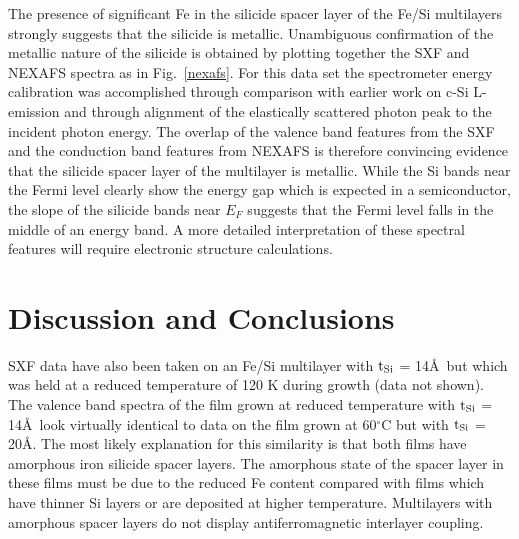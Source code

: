 The presence of significant Fe in the silicide spacer layer of the
Fe/Si multilayers strongly suggests that the silicide is metallic.
Unambiguous confirmation of the metallic nature of the silicide is
obtained by plotting together the SXF and NEXAFS spectra as in
Fig.~\ref{nexafs}.  For this data set the spectrometer energy
calibration was accomplished through comparison with earlier work on
c-Si L-emission\cite{rubensson} and through alignment of the
elastically scattered photon peak to the incident photon energy.  The
overlap of the valence band features from the SXF and the conduction
band features from NEXAFS is therefore convincing evidence that the
silicide spacer layer of the multilayer is metallic.  While the Si
bands near the Fermi level clearly show the energy gap which is
expected in a semiconductor, the slope of the silicide bands near
$E_F$ suggests that the Fermi level falls in the middle of an energy
band.  A more detailed interpretation of these spectral features will
require electronic structure calculations.

\section{Discussion and Conclusions}

SXF data have also been taken on an Fe/Si multilayer with $\rm t_{Si}$ =
14\AA\ but which was held at a reduced temperature of 120 K during
growth (data not shown).  The valence band spectra of the film grown
at reduced temperature with $\rm t_{Si}$ = 14\AA\ look virtually identical
to data on the film grown at 60$^{\circ}$C but with $\rm t_{Si}$ = 20\AA.
The most likely explanation for this similarity is that both films
have amorphous iron silicide spacer layers.  The amorphous state of
the spacer layer in these films must be due to the reduced Fe content
compared with films which have thinner Si layers or are deposited at
higher temperature.  Multilayers with amorphous spacer layers do not
display antiferromagnetic interlayer coupling.\cite{fullerton,fesiprb}

